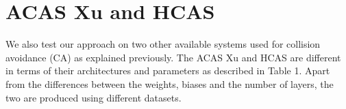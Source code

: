 










\section{ACAS Xu and HCAS}
We also test our approach on two other available systems used for collision avoidance (CA) as explained previously. The ACAS Xu and HCAS are different in terms of their architectures and parameters as described in Table 1. Apart from the differences between the weights, biases and the number of layers, the two are produced using different datasets.

